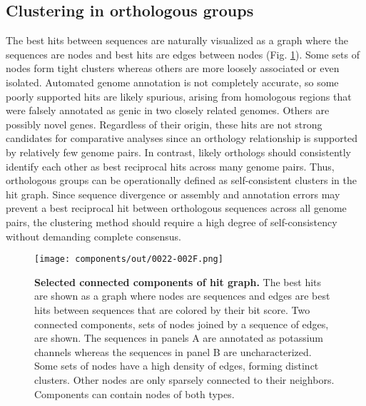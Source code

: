 \documentclass[10pt,letterpaper]{article}
\begin{document}
\subsection*{Clustering in orthologous groups}
The best hits between sequences are naturally visualized as a graph where the sequences are nodes and best hits are edges between nodes (Fig. \ref{fig:components}). Some sets of nodes form tight clusters whereas others are more loosely associated or even isolated. Automated genome annotation is not completely accurate, so some poorly supported hits are likely spurious, arising from homologous regions that were falsely annotated as genic in two closely related genomes. Others are possibly novel genes. Regardless of their origin, these hits are not strong candidates for comparative analyses since an orthology relationship is supported by relatively few genome pairs. In contrast, likely orthologs should consistently identify each other as best reciprocal hits across many genome pairs. Thus, orthologous groups can be operationally defined as self-consistent clusters in the hit graph. Since sequence divergence or assembly and annotation errors may prevent a best reciprocal hit between orthologous sequences across all genome pairs, the clustering method should require a high degree of self-consistency without demanding complete consensus.

\begin{figure}[h!]
\texttt{[image: components/out/0022-002F.png]}
\centering
\caption{\textbf{Selected connected components of hit graph.}
The best hits are shown as a graph where nodes are sequences and edges are best hits between sequences that are colored by their bit score. Two connected components, sets of nodes joined by a sequence of edges, are shown. The sequences in panels A are annotated as potassium channels whereas the sequences in panel B are uncharacterized. Some sets of nodes have a high density of edges, forming distinct clusters. Other nodes are only sparsely connected to their neighbors. Components can contain nodes of both types.}
\label{fig:components}
\end{figure}
\end{document}
